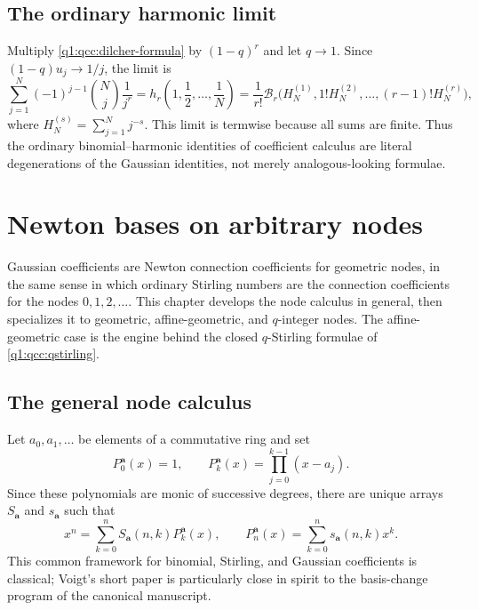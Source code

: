 \documentclass[11pt,a4paper,oneside,openany]{book}
\theoremstyle{definition}
\theoremstyle{remark}
\newcommand{\Y}[1]{\mathcal B_{#1}}
\begin{document}
\section{The ordinary harmonic limit}
Multiply \eqref{q1:qcc:dilcher-formula} by \((1-q)^r\) and let \(q\to1\).
Since \((1-q)u_j\to1/j\), the limit is
\begin{equation}\label{q1:qcc:harmonic-limit}
 \sum_{j=1}^N(-1)^{j-1}\binom Nj\frac1{j^r}
 =h_r\left(1,\frac12,\ldots,\frac1N\right)
 =\frac1{r!}\Y r\bigl(H_N^{(1)},1!H_N^{(2)},\ldots,(r-1)!H_N^{(r)}\bigr),
\end{equation}
where \(H_N^{(s)}=\sum_{j=1}^N j^{-s}\). This limit is termwise because all sums
are finite. Thus the ordinary binomial--harmonic identities of coefficient
calculus are literal degenerations of the Gaussian identities, not merely
analogous-looking formulae.

\chapter{Newton bases on arbitrary nodes}
\label{q3:sec:newton}
Gaussian coefficients are Newton connection coefficients for geometric
nodes, in the same sense in which ordinary Stirling numbers are the
connection coefficients for the nodes \(0,1,2,\ldots\). This chapter develops
the node calculus in general, then specializes it to geometric,
affine-geometric, and \(q\)-integer nodes. The affine-geometric case is the
engine behind the closed \(q\)-Stirling formulae of
\cref{q1:qcc:qstirling}.


\section{The general node calculus}
Let $a_0,a_1,\ldots$ be elements of a commutative ring and set
\begin{equation}
 P_0^{\boldsymbol a}(x)=1,\qquad
 P_k^{\boldsymbol a}(x)=\prod_{j=0}^{k-1}(x-a_j).
 \label{q3:eq:node-basis}
\end{equation}
Since these polynomials are monic of successive degrees, there are unique
arrays $S_{\boldsymbol a}$ and $s_{\boldsymbol a}$ such that
\begin{equation}
 x^n=\sum_{k=0}^nS_{\boldsymbol a}(n,k)P_k^{\boldsymbol a}(x),\qquad
 P_n^{\boldsymbol a}(x)=\sum_{k=0}^ns_{\boldsymbol a}(n,k)x^k.
 \label{q3:eq:node-connections}
\end{equation}
This common framework for binomial, Stirling, and Gaussian coefficients
is classical; Voigt's short paper \cite{voigt} is particularly close in
spirit to the basis-change program of the canonical manuscript.
\end{document}
